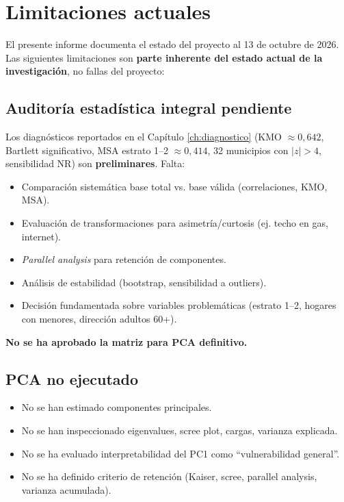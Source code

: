 \section{Limitaciones actuales}
\label{ch:limitaciones}
\label{sec:etapas_pendientes}

El presente informe documenta el estado del proyecto al 13 de octubre de 2026. Las siguientes limitaciones son \textbf{parte inherente del estado actual de la investigación}, no fallas del proyecto:

\subsection{Auditoría estadística integral pendiente}
\label{sec:auditoria_pendiente_limitaciones}

Los diagnósticos reportados en el Capítulo \ref{ch:diagnostico} (KMO $\approx 0,642$, Bartlett significativo, MSA estrato 1--2 $\approx 0,414$, 32 municipios con $|z|>4$, sensibilidad NR) son \textbf{preliminares}. Falta:

\begin{itemize}
    \item Comparación sistemática base total vs. base válida (correlaciones, KMO, MSA).
    \item Evaluación de transformaciones para asimetría/curtosis (ej. techo en gas, internet).
    \item \textit{Parallel analysis} para retención de componentes.
    \item Análisis de estabilidad (bootstrap, sensibilidad a outliers).
    \item Decisión fundamentada sobre variables problemáticas (estrato 1--2, hogares con menores, dirección adultos 60+).
\end{itemize}

\textbf{No se ha aprobado la matriz para PCA definitivo.}

\subsection{PCA no ejecutado}
\label{sec:pca_pendiente}

\begin{itemize}
    \item No se han estimado componentes principales.
    \item No se han inspeccionado eigenvalues, scree plot, cargas, varianza explicada.
    \item No se ha evaluado interpretabilidad del PC1 como ``vulnerabilidad general''.
    \item No se ha definido criterio de retención (Kaiser, scree, parallel analysis, varianza acumulada).
\end{itemize}

